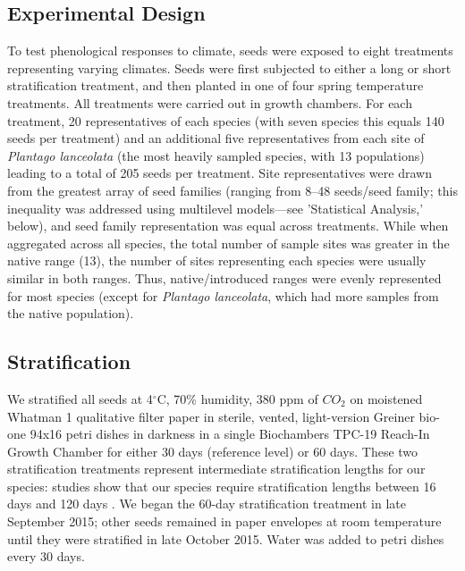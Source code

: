 \documentclass[11pt]{article}\usepackage[]{graphicx}\usepackage[]{color}
\begin{document}
	\subsection{Experimental Design} 
	To test phenological responses to climate, seeds were exposed to eight treatments representing varying climates. Seeds were first subjected to either a long or short stratification treatment, and then planted in one of four spring temperature treatments. All treatments were carried out in growth chambers. For each treatment, 20 representatives of each species (with seven species this equals 140 seeds per treatment) and an additional five representatives from each site of \textit{Plantago lanceolata} (the most heavily sampled species, with 13 populations) leading to a total of 205 seeds per treatment. Site representatives were drawn from the greatest array of seed families (ranging from 8--48 seeds/seed family; this inequality was addressed using multilevel models---see 'Statistical Analysis,' below), and seed family representation was equal across treatments. While when aggregated across all species, the total number of sample sites was greater in the native range (13), the number of sites representing each species were usually similar in both ranges. Thus, native/introduced ranges were evenly represented  for most species (except for \textit{Plantago lanceolata}, which had more samples from the native population).
	
	\subsection{Stratification} 
	We stratified all seeds at 4$^\circ$C, 70\% humidity, 380 ppm of $CO_2$ \parencite[e.g.,][]{Meekins1999,Popay1970} on moistened Whatman 1 qualitative filter paper in sterile, vented, light-version Greiner bio-one 94x16 petri dishes in darkness \parencite{Baskin1998,Popay1970} in a single Biochambers TPC-19 Reach-In Growth Chamber for either 30 days (reference level) or 60 days. These two stratification treatments represent intermediate stratification lengths for our species: studies show that our species require stratification lengths between 16 days \parencite{Popay1970} and 120 days \parencite{Meekins1999}. We began the 60-day stratification treatment in late September 2015; other seeds remained in paper envelopes at room temperature until they were stratified in late October 2015. Water was added to petri dishes every 30 days.
	
\end{document}
